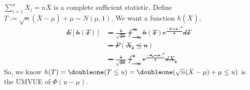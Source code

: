 \subsection{} %

$\sum_{i=1}^n X_i = n\bar X$ is a complete sufficient statistic.
Define $T:=\sqrt{n}(\bar X - \mu) + \mu \sim N(\mu, 1)$.
We want a function $h(\bar X)$, \st
\begin{align}
    E[h(T)]
        &= \frac{1}{\sqrt{2\pi}}\int_{-\infty}^\infty
            h(T) e^{\frac{(T-\mu)^2}{2}}dT \\
        &= P(X_1\le u) \\
        &= \frac{1}{\sqrt{2\pi}}\int_{-\infty}^u e^{\frac{(X_1-\mu)^2}{2}} d X_1
\end{align}
So, we know $h(T)=\doubleone(T\le u)=\doubleone(\sqrt{n}(\bar X - \mu) + \mu \le u)$
is the UMVUE of $\Phi(u-\mu)$.

\subsection{} %

\subsubsection{} %

